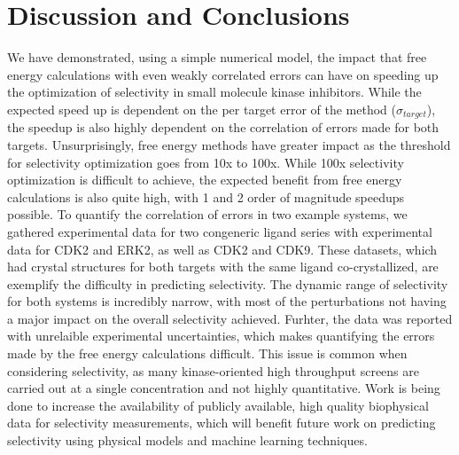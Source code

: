 \documentclass[phd,tocprelim]{cornell}
\begin{document}
\section{Discussion and Conclusions}
We have demonstrated, using a simple numerical model, the impact that free energy calculations with even weakly correlated errors can have on speeding up the optimization of selectivity in small molecule kinase inhibitors. While the expected speed up is dependent on the per target error of the method ($\sigma_{target}$), the speedup is also highly dependent on the correlation of errors made for both targets. Unsurprisingly, free energy methods have greater impact as the threshold for selectivity optimization goes from 10x to 100x. While 100x selectivity optimization is difficult to achieve, the expected benefit from free energy calculations is also quite high, with 1 and 2 order of magnitude speedups possible. 
To quantify the correlation of errors in two example systems, we gathered experimental data for two congeneric ligand series with experimental data for CDK2 and ERK2, as well as CDK2 and CDK9. These datasets, which had crystal structures for both targets with the same ligand co-crystallized, are exemplify the difficulty in predicting selectivity. The dynamic range of selectivity for both systems is incredibly narrow, with most of the perturbations not having a major impact on the overall selectivity achieved. Furhter, the data was reported with unrelaible experimental uncertainties, which makes quantifying the errors made by the free energy calculations difficult. This issue is common when considering selectivity, as many kinase-oriented high throughput screens are carried out at a single concentration and not highly quantitative. Work is being done to increase the availability of publicly available, high quality biophysical data for selectivity measurements, which will benefit future work on predicting selectivity using physical models and machine learning techniques. 
\end{document}
